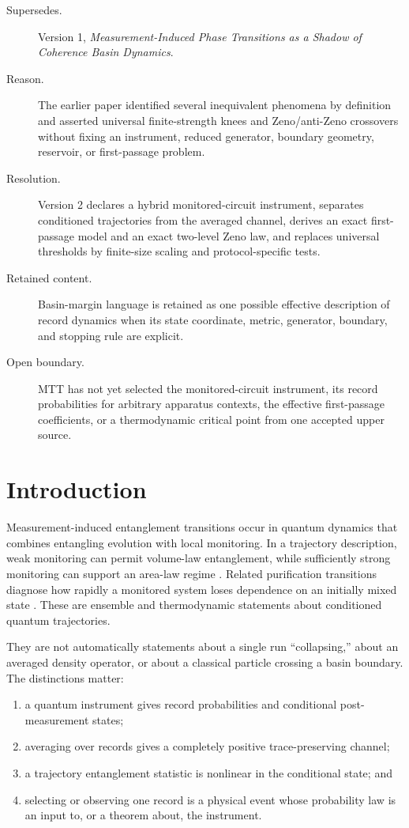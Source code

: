 \documentclass[11pt]{article}
\begin{document}
\begin{description}
\item[Supersedes.] Version 1, \emph{Measurement-Induced Phase
Transitions as a Shadow of Coherence Basin Dynamics}.
\item[Reason.] The earlier paper identified several inequivalent
phenomena by definition and asserted universal finite-strength knees and
Zeno/anti-Zeno crossovers without fixing an instrument, reduced
generator, boundary geometry, reservoir, or first-passage problem.
\item[Resolution.] Version 2 declares a hybrid monitored-circuit
instrument, separates conditioned trajectories from the averaged
channel, derives an exact first-passage model and an exact two-level
Zeno law, and replaces universal thresholds by finite-size scaling and
protocol-specific tests.
\item[Retained content.] Basin-margin language is retained as one
possible effective description of record dynamics when its state
coordinate, metric, generator, boundary, and stopping rule are explicit.
\item[Open boundary.] MTT has not yet selected the monitored-circuit
instrument, its record probabilities for arbitrary apparatus contexts,
the effective first-passage coefficients, or a thermodynamic critical
point from one accepted upper source.
\end{description}

\section{Introduction}

Measurement-induced entanglement transitions occur in quantum dynamics
that combines entangling evolution with local monitoring.  In a
trajectory description, weak monitoring can permit volume-law
entanglement, while sufficiently strong monitoring can support an
area-law regime \cite{skinner2019,li2018}.  Related purification
transitions diagnose how rapidly a monitored system loses dependence on
an initially mixed state \cite{gullans2020}.  These are ensemble and
thermodynamic statements about conditioned quantum trajectories.

They are not automatically statements about a single run ``collapsing,''
about an averaged density operator, or about a classical particle
crossing a basin boundary.  The distinctions matter:
\begin{enumerate}
\item a quantum instrument gives record probabilities and conditional
post-measurement states;
\item averaging over records gives a completely positive
trace-preserving channel;
\item a trajectory entanglement statistic is nonlinear in the
conditional state; and
\item selecting or observing one record is a physical event whose
probability law is an input to, or a theorem about, the instrument.
\end{enumerate}
\end{document}
